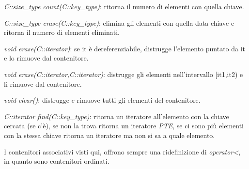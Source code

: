 \begin{description}
	\item \textit{C::size\_type count(C::key\_type)}: ritorna il numero di elementi con quella chiave.
	\item \textit{C::size\_type erase(C::key\_type)}: elimina gli elementi con quella data chiave e ritorna il numero di elementi eliminati.
	\item \textit{void erase(C::iterator)}: se it è dereferenziabile, distrugge l'elemento puntato da it e lo rimuove dal contenitore.
	\item \textit{void erase(C::iterator,C::iterator)}: distrugge gli elementi nell'intervallo [it1,it2) e li rimuove dal contenitore.
	\item \textit{void clear()}: distrugge e rimuove tutti gli elementi del contenitore.
	\item \textit{C::iterator find(C::key\_type)}: ritorna un iteratore all'elemento con la chiave cercata (se c'è), se non la trova ritorna un iteratore \textit{PTE}, se ci sono più elementi con la stessa chiave ritorna un iteratore ma non si sa a quale elemento.
\end{description}

I contenitori associativi visti qui, offrono sempre una ridefinizione di \textit{operator<}, in quanto sono contenitori ordinati.




